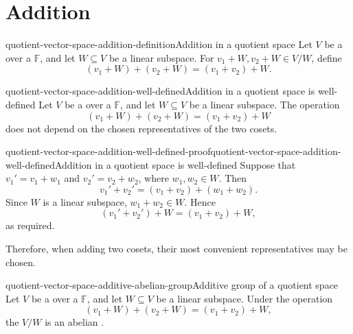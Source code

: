 \documentclass[preview]{standalone}
\begin{document}
\genpage

\section{Addition}

\begin{snippetdefinition}{quotient-vector-space-addition-definition}{Addition in a quotient space}
    Let \(V\) be a \vectorspace over a \field \(\mathbb{F}\), and let
    \(W\subseteq V\) be a linear subspace. For \(v_1+W,v_2+W\in V/W\),
    define
    \[
        (v_1+W)+(v_2+W)=(v_1+v_2)+W.
    \]
\end{snippetdefinition}

\begin{snippetproposition}{quotient-vector-space-addition-well-defined}{Addition in a quotient space is well-defined}
    Let \(V\) be a \vectorspace over a \field \(\mathbb{F}\), and let
    \(W\subseteq V\) be a linear subspace. The operation
    \[
        (v_1+W)+(v_2+W)=(v_1+v_2)+W
    \]
    does not depend on the chosen representatives of the two cosets.
\end{snippetproposition}

\begin{snippetproof}{quotient-vector-space-addition-well-defined-proof}{quotient-vector-space-addition-well-defined}{Addition in a quotient space is well-defined}
    Suppose that \(v_1'=v_1+w_1\) and \(v_2'=v_2+w_2\), where
    \(w_1,w_2\in W\). Then
    \[
        v_1'+v_2'=(v_1+v_2)+(w_1+w_2).
    \]
    Since \(W\) is a linear subspace, \(w_1+w_2\in W\). Hence
    \[
        (v_1'+v_2')+W=(v_1+v_2)+W,
    \]
    as required.
\end{snippetproof}

\begin{plainhtml}
    Therefore, when adding two cosets, their most convenient representatives may be chosen.
\end{plainhtml}

\begin{snippetproposition}{quotient-vector-space-additive-abelian-group}{Additive group of a quotient space}
    Let \(V\) be a \vectorspace over a \field \(\mathbb{F}\), and let
    \(W\subseteq V\) be a linear subspace. Under the operation
    \[
        (v_1+W)+(v_2+W)=(v_1+v_2)+W,
    \]
    the \set \(V/W\) is an abelian \group.
\end{snippetproposition}
\end{document}
